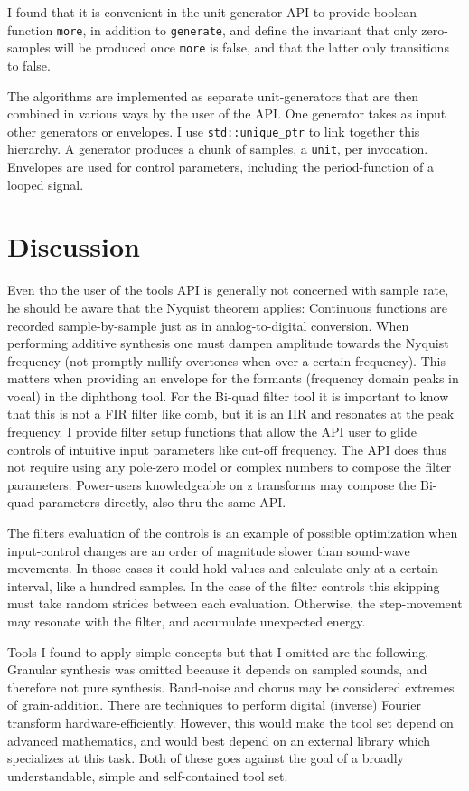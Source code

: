 \documentclass{article}
\begin{document}
I found that it is convenient in the unit-generator API
to provide boolean function \verb|more|,
in addition to \verb|generate|,
and define the invariant that only zero-samples will be produced
once \verb|more| is false, and that the latter only transitions to false.

The algorithms are implemented as separate unit-generators that are then
combined in various ways by the user of the API.
One generator takes as input other generators or envelopes.
I use \verb|std::unique_ptr| to link together this hierarchy.
A generator produces a chunk of samples, a \verb|unit|, per invocation.
Envelopes are used for control parameters, including the period-function
of a looped signal.

\section{Discussion}

Even tho the user of the tools API is generally not concerned with sample rate,
he should be aware that the Nyquist theorem applies:
Continuous functions are recorded sample-by-sample just as
in analog-to-digital conversion.
When performing additive synthesis one must dampen amplitude towards
the Nyquist frequency (not promptly nullify overtones when
over a certain frequency).
This matters when providing an envelope for the formants
(frequency domain peaks in vocal) in the diphthong tool.
For the Bi-quad filter tool it is important to know that this is not a FIR
filter like comb, but it is an IIR and resonates at the peak frequency.
I provide filter setup functions that allow the API user
to glide controls of intuitive input parameters like cut-off frequency.
The API does thus not require using any pole-zero model or complex numbers
to compose the filter parameters.
Power-users knowledgeable on z transforms may compose the Bi-quad parameters
directly, also thru the same API.

The filters evaluation of the controls
is an example of possible optimization when input-control
changes are an order of magnitude slower than sound-wave movements.  In those
cases it could hold values and calculate only at a certain interval, like
a hundred samples.  In the case of the filter controls this skipping must take
random strides between each evaluation.  Otherwise, the step-movement may
resonate with the filter, and accumulate unexpected energy.

Tools I found to apply simple concepts but that I omitted are the following.
Granular synthesis was omitted because it depends on sampled sounds, and
therefore not pure synthesis.
Band-noise and chorus may be considered extremes of grain-addition.
There are techniques to perform digital (inverse) Fourier transform
hardware-efficiently.
However, this would make the tool set depend on advanced mathematics, and
would best depend on an external library which specializes at this task.
Both of these goes against the goal of a broadly understandable, simple
and self-contained tool set.
\end{document}
